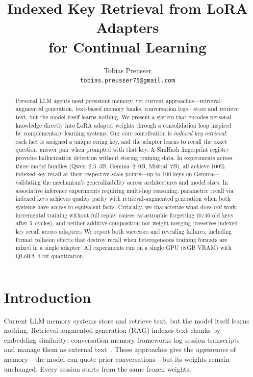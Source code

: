 \documentclass[11pt]{article}
\title{Indexed Key Retrieval from LoRA Adapters\\for Continual Learning}
\author{
  Tobias Preusser \\
  \texttt{tobias.preusser75@gmail.com}
}
\begin{document}
\maketitle

\begin{abstract}
Personal LLM agents need persistent memory, yet current approaches---retrieval-augmented generation, text-based memory banks, conversation logs---store and retrieve text, but the model itself learns nothing.
We present a system that encodes personal knowledge directly into LoRA adapter weights through a consolidation loop inspired by complementary learning systems.
Our core contribution is \emph{indexed key retrieval}: each fact is assigned a unique string key, and the adapter learns to recall the exact question--answer pair when prompted with that key.
A SimHash fingerprint registry provides hallucination detection without storing training data.
In experiments across three model families (Qwen~2.5~3B, Gemma~2~9B, Mistral~7B), all achieve 100\% indexed key recall at their respective scale points---up to 100 keys on Gemma---validating the mechanism's generalizability across architectures and model sizes.
In associative inference experiments requiring multi-hop reasoning, parametric recall via indexed keys achieves quality parity with retrieval-augmented generation when both systems have access to equivalent facts.
Critically, we characterize what does \emph{not} work: incremental training without full replay causes catastrophic forgetting (0/40 old keys after 5~cycles), and neither additive composition nor weight merging preserves indexed key recall across adapters.
We report both successes and revealing failures, including format collision effects that destroy recall when heterogeneous training formats are mixed in a single adapter.
All experiments run on a single GPU (8\,GB VRAM) with QLoRA 4-bit quantization.
\end{abstract}

\section{Introduction}
\label{sec:intro}

Current LLM memory systems store and retrieve text, but the model itself learns nothing.
Retrieval-augmented generation (RAG) indexes text chunks by embedding similarity; conversation memory frameworks log session transcripts and manage them as external text~\citep{gao2025memos}.
These approaches give the \emph{appearance} of memory---the model can quote prior conversations---but its weights remain unchanged.
Every session starts from the same frozen weights.
\end{document}
